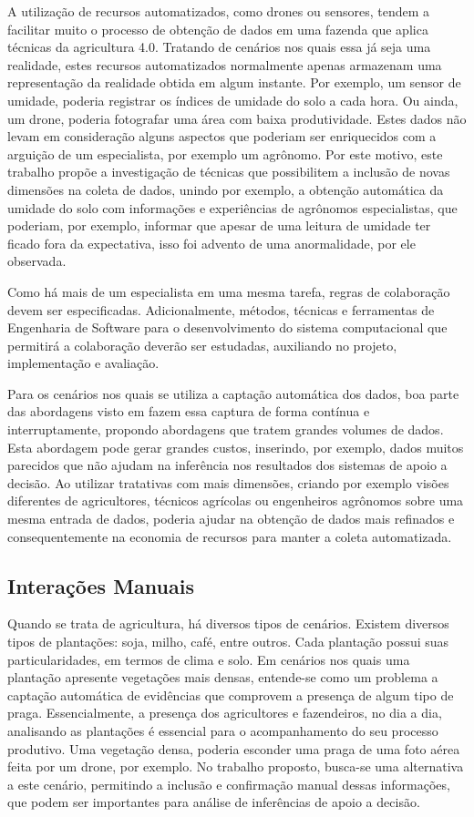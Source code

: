 \documentclass[12pt]{article}
\begin{document}
A utilização de recursos automatizados, como drones ou sensores, tendem a facilitar muito o processo de obtenção de dados em uma fazenda que aplica técnicas da agricultura 4.0. Tratando de cenários nos quais essa já seja uma realidade, estes recursos automatizados normalmente apenas armazenam uma representação da realidade obtida em algum instante. Por exemplo, um sensor de umidade, poderia registrar os índices de umidade do solo a cada hora. Ou ainda, um drone, poderia fotografar uma área com baixa produtividade. Estes dados não levam em consideração alguns aspectos que poderiam ser enriquecidos com a arguição de um especialista, por exemplo um agrônomo. Por este motivo, este trabalho propõe a investigação de técnicas que possibilitem a inclusão de novas dimensões na coleta de dados, unindo por exemplo, a obtenção automática da umidade do solo com informações e experiências de agrônomos especialistas, que poderiam, por exemplo, informar que apesar de uma leitura de umidade ter ficado fora da expectativa, isso foi advento de uma anormalidade, por ele observada. 

Como há mais de um especialista em uma mesma tarefa, regras de colaboração devem ser especificadas. Adicionalmente, métodos, técnicas e ferramentas de Engenharia de Software para o desenvolvimento do sistema computacional que permitirá a colaboração deverão ser estudadas, auxiliando no projeto, implementação e avaliação.

Para os cenários nos quais se utiliza a captação automática dos dados, boa parte das abordagens visto em \cite{Massruha:2017} fazem essa captura de forma contínua e interruptamente, propondo abordagens que tratem grandes volumes de dados. Esta abordagem pode gerar grandes custos, inserindo, por exemplo, dados muitos parecidos que não ajudam na inferência nos resultados dos sistemas de apoio a decisão. Ao utilizar tratativas com mais dimensões, criando por exemplo visões diferentes de agricultores, técnicos agrícolas ou engenheiros agrônomos sobre uma mesma entrada de dados, poderia ajudar na obtenção de dados mais refinados e consequentemente na economia de recursos para manter a coleta automatizada.

\subsection{Interações Manuais}
\label{subsec:interacoes_manuais}

Quando se trata de agricultura, há diversos tipos de cenários. Existem diversos tipos de plantações: soja, milho, café, entre outros. Cada plantação possui suas particularidades, em termos de clima e solo. Em cenários nos quais uma plantação apresente vegetações mais densas, entende-se como um problema a captação automática de evidências que comprovem a presença de algum tipo de praga. Essencialmente, a presença dos agricultores e fazendeiros, no dia a dia, analisando as plantações é essencial para o acompanhamento do seu processo produtivo. Uma vegetação densa, poderia esconder uma praga de uma foto aérea feita por um drone, por exemplo. No trabalho proposto, busca-se uma alternativa a este cenário, permitindo a inclusão e confirmação manual dessas informações, que podem ser importantes para análise de inferências de apoio a decisão.
\end{document}

